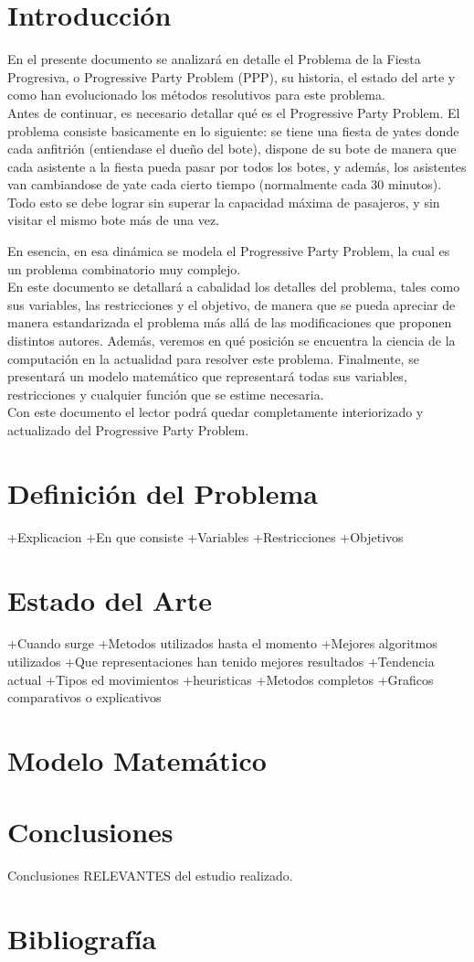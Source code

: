 \documentclass[letter, 10pt]{article}
\begin{document}
\section{Introducción}
En el presente documento se analizará en detalle el Problema de la Fiesta Progresiva, o Progressive Party Problem (PPP), su historia, el estado del arte y como han evolucionado los métodos resolutivos para este problema.\\

Antes de continuar, es necesario detallar qué es el Progressive Party Problem. El problema consiste basicamente en lo siguiente: se tiene una fiesta de yates donde cada anfitrión (entiendase el dueño del bote), dispone de su bote de manera que cada asistente a la fiesta pueda pasar por todos los botes, y además, los asistentes van cambiandose de yate cada cierto tiempo (normalmente cada 30 minutos). Todo esto se debe lograr sin superar la capacidad máxima de pasajeros, y sin visitar el mismo bote más de una vez.

En esencia, en esa dinámica se modela el Progressive Party Problem, la cual es un problema combinatorio muy complejo.\\

En este documento se detallará a cabalidad los detalles del problema, tales como sus variables, las restricciones y el objetivo, de manera que se pueda apreciar de manera estandarizada el problema más allá de las modificaciones que proponen distintos autores. Además, veremos en qué posición se encuentra la ciencia de la computación en la actualidad para resolver este problema. Finalmente, se presentará un modelo matemático que representará todas sus variables, restricciones y cualquier función que se estime necesaria.\\

Con este documento el lector podrá quedar completamente interiorizado y actualizado del Progressive Party Problem.

\section{Definición del Problema}
+Explicacion
+En que consiste
+Variables
+Restricciones
+Objetivos

\section{Estado del Arte}
+Cuando surge
+Metodos utilizados hasta el momento
+Mejores algoritmos utilizados
+Que representaciones han tenido mejores resultados
+Tendencia actual
+Tipos ed movimientos
+heuristicas
+Metodos completos
+Graficos comparativos o explicativos



\section{Modelo Matemático}

\section{Conclusiones}
Conclusiones RELEVANTES del estudio realizado.

\section{Bibliografía}


\end{document}
